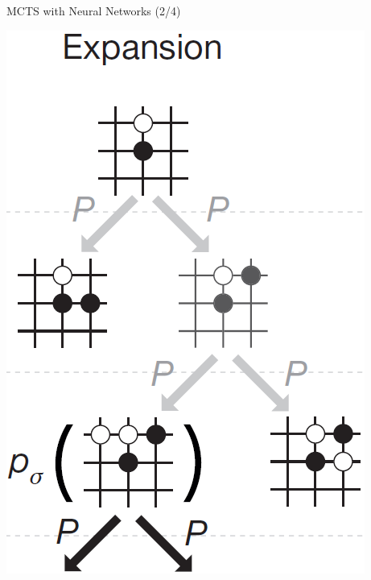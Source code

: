 \documentclass{beamer}
\begin{document}
{    \begin{frame}{MCTS with Neural Networks (2/4)}
      \begin{center}
        \includegraphics[height=.85\textheight]{../img/MCTS_expansion.png}
      \end{center}
    \end{frame}

}
\end{document}
